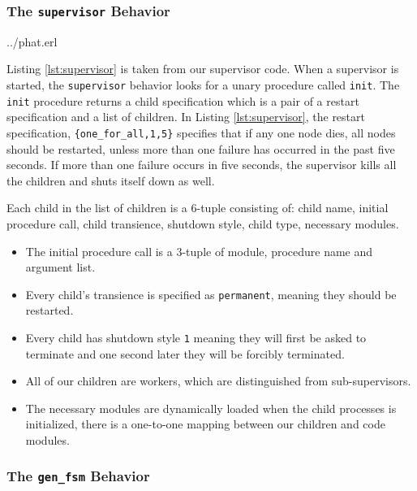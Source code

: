 \documentclass[10pt,letter]{article}
\begin{document}
\subsubsection{The \texttt{supervisor} Behavior}


                {../phat.erl}

Listing \ref{lst:supervisor} is taken from our supervisor code. When a
supervisor is started, the \texttt{supervisor} behavior looks for a unary
procedure called \lstinline!init!. The \lstinline!init! procedure returns a
child specification which is a pair of a restart specification and a list of
children. In Listing \ref{lst:supervisor}, the restart specification,
\lstinline!{one_for_all,1,5}! specifies that if any one node dies, all nodes
should be restarted, unless more than one failure has occurred in the past five
seconds. If more than one failure occurs in five seconds, the supervisor kills
all the children and shuts itself down as well.

Each child in the list of children is a 6-tuple consisting of: child name,
initial procedure call, child transience, shutdown style, child type, necessary
modules.

\begin{itemize}
\item The initial procedure call is a 3-tuple of module, procedure name and
  argument list.
\item Every child's transience is specified as \lstinline!permanent!, meaning
  they should be restarted.
\item Every child has shutdown style \lstinline!1! meaning they will first be
  asked to terminate and one second later they will be forcibly terminated.
\item All of our children are workers, which are distinguished from
  sub-supervisors.
\item The necessary modules are dynamically loaded when the child processes is
  initialized, there is a one-to-one mapping between our children and code
  modules.
\end{itemize}

\subsubsection{The \texttt{gen\_fsm} Behavior}
\end{document}
